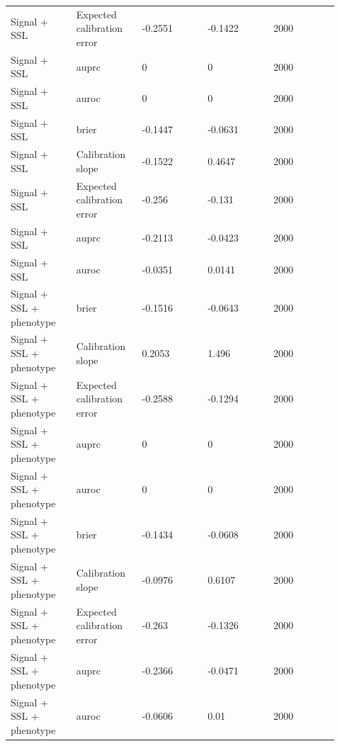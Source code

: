 \documentclass[utf8]{frontiers_suppmat}
\begin{document}
\begin{landscape}
\begin{longtable}{L{0.184\linewidth} L{0.184\linewidth} L{0.184\linewidth} L{0.184\linewidth} L{0.184\linewidth}}
Signal + SSL & Expected calibration error & -\allowbreak{}0.\allowbreak{}2551 & -\allowbreak{}0.\allowbreak{}1422 & 2000 \\
Signal + SSL & auprc & 0 & 0 & 2000 \\
Signal + SSL & auroc & 0 & 0 & 2000 \\
Signal + SSL & brier & -\allowbreak{}0.\allowbreak{}1447 & -\allowbreak{}0.\allowbreak{}0631 & 2000 \\
Signal + SSL & Calibration slope & -\allowbreak{}0.\allowbreak{}1522 & 0.\allowbreak{}4647 & 2000 \\
Signal + SSL & Expected calibration error & -\allowbreak{}0.\allowbreak{}256 & -\allowbreak{}0.\allowbreak{}131 & 2000 \\
Signal + SSL & auprc & -\allowbreak{}0.\allowbreak{}2113 & -\allowbreak{}0.\allowbreak{}0423 & 2000 \\
Signal + SSL & auroc & -\allowbreak{}0.\allowbreak{}0351 & 0.\allowbreak{}0141 & 2000 \\
Signal + SSL + phenotype & brier & -\allowbreak{}0.\allowbreak{}1516 & -\allowbreak{}0.\allowbreak{}0643 & 2000 \\
Signal + SSL + phenotype & Calibration slope & 0.\allowbreak{}2053 & 1.\allowbreak{}496 & 2000 \\
Signal + SSL + phenotype & Expected calibration error & -\allowbreak{}0.\allowbreak{}2588 & -\allowbreak{}0.\allowbreak{}1294 & 2000 \\
Signal + SSL + phenotype & auprc & 0 & 0 & 2000 \\
Signal + SSL + phenotype & auroc & 0 & 0 & 2000 \\
Signal + SSL + phenotype & brier & -\allowbreak{}0.\allowbreak{}1434 & -\allowbreak{}0.\allowbreak{}0608 & 2000 \\
Signal + SSL + phenotype & Calibration slope & -\allowbreak{}0.\allowbreak{}0976 & 0.\allowbreak{}6107 & 2000 \\
Signal + SSL + phenotype & Expected calibration error & -\allowbreak{}0.\allowbreak{}263 & -\allowbreak{}0.\allowbreak{}1326 & 2000 \\
Signal + SSL + phenotype & auprc & -\allowbreak{}0.\allowbreak{}2366 & -\allowbreak{}0.\allowbreak{}0471 & 2000 \\
Signal + SSL + phenotype & auroc & -\allowbreak{}0.\allowbreak{}0606 & 0.\allowbreak{}01 & 2000 \\
\end{longtable}
\normalsize
\end{landscape}
\end{document}

